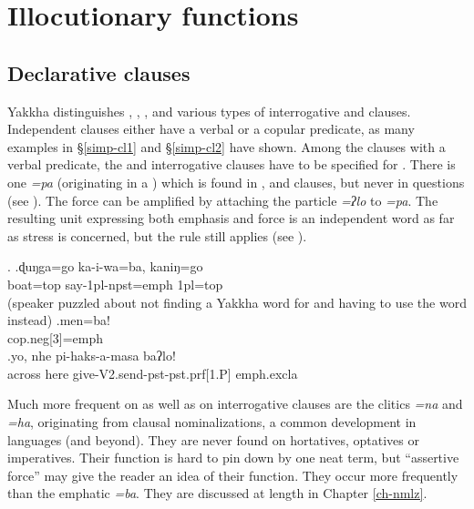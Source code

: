 \section{Illocutionary functions}\label{simp-cl3}
 

\subsection{Declarative clauses }
 Yakkha distinguishes , , , and various types of interrogative and  clauses.
 Independent  clauses either have a verbal or a copular predicate, as many examples in  §\ref{simp-cl1} and §\ref{simp-cl2} have shown. Among the clauses with a verbal predicate, the  and interrogative clauses have to be specified for . There is one  \emph{=pa} (originating in a ) which is found in ,  and   clauses, but never in questions (see \Next). The  force can be amplified by attaching the  particle \emph{=ʔlo} to \emph{=pa}. The resulting unit expressing both emphasis and  force is an independent word as far as stress is concerned, but the  rule still applies (see \Next[c]). 
 
 \ex. \ag.ɖuŋga=go     ka-i-wa=ba,               kaniŋ=go\\
 boat{\sc =top} say{\sc -1pl-npst=emph} {\sc 1pl=top}\\
  (speaker puzzled about not finding a Yakkha word for  and having to use the  word instead) 
 \bg.men=ba!\\
 {\sc cop.neg[3]=emph}\\
 \bg.yo,   nhe  pi-haks-a-masa       baʔlo!\\
 across here give{\sc -V2.send-pst-pst.prf[1.P]} {\sc emph.excla}\\
  
 
Much more frequent on  as well as on interrogative clauses are the clitics \emph{=na} and \emph{=ha}, originating from clausal nominalizations, a common development in  languages (and beyond). They are never found on hortatives, optatives or imperatives. Their function is hard to pin down by one neat term, but “assertive force” may give the reader an idea of their function. They occur more frequently than the emphatic \emph{=ba}. They are discussed at length in Chapter \ref{ch-nmlz}. 

